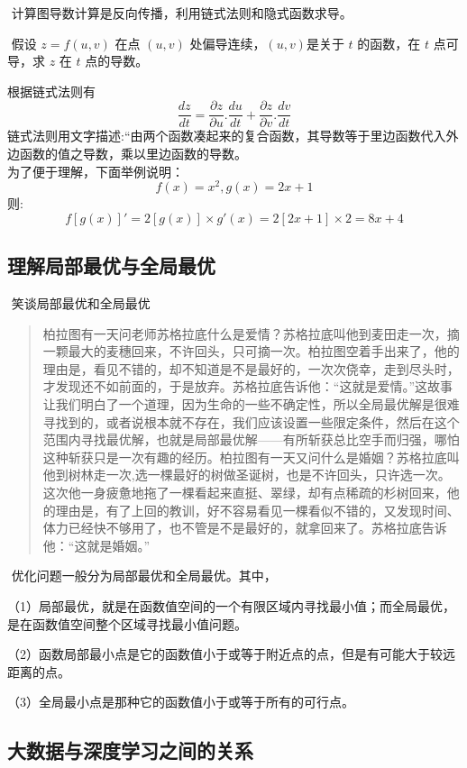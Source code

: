 ​ 计算图导数计算是反向传播，利用链式法则和隐式函数求导。

​ 假设 $z = f(u,v)$ 在点 $(u,v)$ 处偏导连续，$(u,v)$是关于 $t$
的函数，在 $t$ 点可导，求 $z$ 在 $t$ 点的导数。

根据链式法则有 \[
\frac{dz}{dt}=\frac{\partial z}{\partial u}.\frac{du}{dt}+\frac{\partial z}{\partial v}
                .\frac{dv}{dt}
\] ​
链式法则用文字描述:``由两个函数凑起来的复合函数，其导数等于里边函数代入外边函数的值之导数，乘以里边函数的导数。\\
​ 为了便于理解，下面举例说明： \[
f(x)=x^2,g(x)=2x+1
\] ​ 则: \[
{f[g(x)]}'=2[g(x)] \times g'(x)=2[2x+1] \times 2=8x+4
\]

\subsection{理解局部最优与全局最优}\label{ux7406ux89e3ux5c40ux90e8ux6700ux4f18ux4e0eux5168ux5c40ux6700ux4f18}

​ 笑谈局部最优和全局最优

\begin{quote}
​
柏拉图有一天问老师苏格拉底什么是爱情？苏格拉底叫他到麦田走一次，摘一颗最大的麦穗回来，不许回头，只可摘一次。柏拉图空着手出来了，他的理由是，看见不错的，却不知道是不是最好的，一次次侥幸，走到尽头时，才发现还不如前面的，于是放弃。苏格拉底告诉他：``这就是爱情。''这故事让我们明白了一个道理，因为生命的一些不确定性，所以全局最优解是很难寻找到的，或者说根本就不存在，我们应该设置一些限定条件，然后在这个范围内寻找最优解，也就是局部最优解------有所斩获总比空手而归强，哪怕这种斩获只是一次有趣的经历。
​
柏拉图有一天又问什么是婚姻？苏格拉底叫他到树林走一次,选一棵最好的树做圣诞树，也是不许回头，只许选一次。这次他一身疲惫地拖了一棵看起来直挺、翠绿，却有点稀疏的杉树回来，他的理由是，有了上回的教训，好不容易看见一棵看似不错的，又发现时间、体力已经快不够用了，也不管是不是最好的，就拿回来了。苏格拉底告诉他：``这就是婚姻。''
\end{quote}

​ 优化问题一般分为局部最优和全局最优。其中，

（1）局部最优，就是在函数值空间的一个有限区域内寻找最小值；而全局最优，是在函数值空间整个区域寻找最小值问题。

（2）函数局部最小点是它的函数值小于或等于附近点的点，但是有可能大于较远距离的点。

（3）全局最小点是那种它的函数值小于或等于所有的可行点。

\subsection{大数据与深度学习之间的关系}\label{ux5927ux6570ux636eux4e0eux6df1ux5ea6ux5b66ux4e60ux4e4bux95f4ux7684ux5173ux7cfb}

